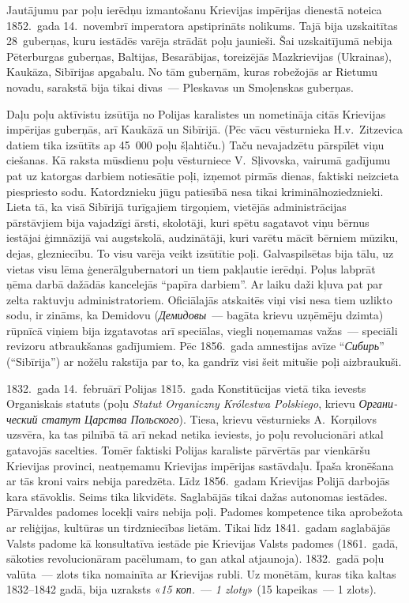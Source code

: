 \documentclass[twoside,a5paper,12pt,fleqn,openany]{extbook}
\newcommand{\pltxti}[1]{\textit{\textpolish{#1}}}
\newcommand{\rutxti}[1]{\textit{\textrussian{#1}}}
\begin{document}
Jautājumu par poļu ierēdņu izmantošanu Krievijas impērijas dienestā noteica 1852.~gada 14.~novembrī imperatora apstiprināts nolikums. Tajā bija uzskaitītas 28~guberņas, kuru iestādēs varēja strādāt poļu jaunieši. Šai uzskaitījumā nebija Pēterburgas guberņas, Baltijas, Besarābijas, toreizējās Mazkrievijas (Ukrainas), Kaukāza, Sibīrijas apgabalu. No tām guberņām, kuras robežojās ar Rietumu novadu, sarakstā bija tikai divas~--- Pleskavas un Smoļenskas guberņas.

Daļu poļu aktīvistu izsūtīja no Polijas karalistes un nometināja citās Krievijas impērijas guberņās, arī Kaukāzā un Sibīrijā. (Pēc vācu vēsturnieka H.v.~Zitzevica datiem tika izsūtīts ap 45~000 poļu šļahtiču.) Taču nevajadzētu pārspīlēt viņu ciešanas. Kā raksta mūsdienu poļu vēsturniece V.~Sļivovska, vairumā gadījumu pat uz katorgas darbiem notiesātie poļi, izņemot pirmās dienas, faktiski neizcieta piespriesto sodu. Katordznieku jūgu patiesībā nesa tikai kriminālnoziedznieki. Lieta tā, ka visā Sibīrijā turīgajiem tirgoņiem, vietējās administrācijas pārstāvjiem bija vajadzīgi ārsti, skolotāji, kuri spētu sagatavot viņu bērnus iestājai ģimnāzijā vai augstskolā, audzinātāji, kuri varētu mācīt bērniem mūziku, dejas, glezniecību. To visu varēja veikt izsūtītie poļi. Galvaspilsētas bija tālu, uz vietas visu lēma ģenerālgubernatori un tiem pakļautie ierēdņi. Poļus labprāt ņēma darbā dažādās kancelejās ``papīra darbiem''. Ar laiku daži kļuva pat par zelta raktuvju administratoriem. Oficiālajās atskaitēs viņi visi nesa tiem uzlikto sodu, ir zināms, ka Demidovu (\rutxti{Демидовы}~--- bagāta krievu uzņēmēju dzimta) rūpnīcā viņiem bija izgatavotas arī speciālas, viegli noņemamas važas~--- speciāli revizoru atbraukšanas gadījumiem. Pēc 1856.~gada amnestijas avīze ``\rutxti{Сибирь}'' (``Sibīrija'') ar nožēlu rakstīja par to, ka gandrīz visi šeit mitušie poļi aizbraukuši.

1832.~gada 14.~februārī Polijas 1815.~gada Konstitūcijas vietā tika ievests Organiskais statuts (poļu \pltxti{Statut Organiczny Królestwa Polskiego}, krievu \rutxti{Органический статут Царства Польского}). Tiesa, krievu vēsturnieks A.~Korņilovs uzsvēra, ka tas pilnībā tā arī nekad netika ieviests, jo poļu revolucionāri atkal gatavojās sacelties. Tomēr faktiski Polijas karaliste pārvērtās par vienkāršu Krievijas provinci, neatņemamu Krievijas impērijas sastāvdaļu. Īpaša kronēšana ar tās kroni vairs nebija paredzēta. Līdz 1856.~gadam Krievijas Polijā darbojās kara stāvoklis. Seims tika likvidēts. Saglabājās tikai dažas autonomas iestādes. Pārvaldes padomes locekļi vairs nebija poļi. Padomes kompetence tika aprobežota ar reliģijas, kultūras un tirdzniecības lietām. Tikai līdz 1841.~gadam saglabājās Valsts padome kā konsultatīva iestāde pie Krievijas Valsts padomes (1861.~gadā, sākoties revolucionāram pacēlumam, to gan atkal atjaunoja). 1832.~gadā poļu valūta~--- zlots tika nomainīta ar Krievijas rubli. Uz monētām, kuras tika kaltas 1832--1842 gadā, bija uzraksts «\rutxti{15 коп.}~--- \pltxti{1 zloty}» (15 kapeikas~--- 1 zlots).
\end{document}
